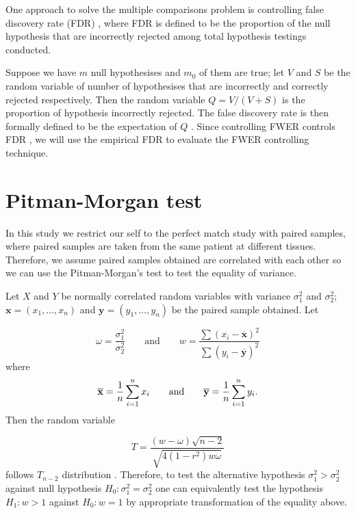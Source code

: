 \documentclass{report}
\begin{document}
\par
 One approach to solve the multiple comparisons problem is controlling false discovery 
rate (FDR) \cite{benjamini1995controlling}, where FDR is defined to be the proportion of the null
hypothesis that are incorrectly rejected among total hypothesis testings conducted.
\par Suppose we have $m$ null hypothesises and $m_0$ of them are true; let $V$ and $S$ 
be the random variable of number of hypothesises that are incorrectly and correctly rejected respectively. 
Then the random variable $Q = V/(V+S)$ is the proportion of hypothesis incorrectly rejected. The false discovery rate is then formally defined to be the expectation of $Q$ \cite{benjamini1995controlling}.
Since controlling FWER controls FDR \cite{benjamini1995controlling}, we will use the empirical FDR to evaluate the FWER controlling technique. 





\section{Pitman-Morgan test} \label{section : pitman-morgan test}
\par
In this study we restrict our self to the perfect match study with paired samples, where paired samples are taken from the same patient at different tissues.
Therefore, we assume paired samples obtained are correlated with each other so we can use 
the Pitman-Morgan's test to test the equality of variance.
\par 
 Let $X$ and $Y$ be normally correlated random variables with variance $\sigma_1^2$ and $\sigma_2^2$; 
$\mathbf{x} = (x_1,\ldots,x_n)$ and $\mathbf{y} = (y_1,\ldots,y_n)$ be the paired sample obtained. Let

\[ 
    \omega = \frac{\sigma_1^2}{\sigma_2^2} \qquad \text{and}\qquad  w = \frac{ \sum (x_i - \overline{\mathbf{x}})^2}{ \sum (y_i - \overline{\mathbf{y}})^2}
\]
where
\[ 
    \overline{\mathbf{x}} = \frac{1}{n} \sum\limits_{i=1}^{n} x_i \qquad \text{and}\qquad  \overline{\mathbf{y}} = \frac{1}{n} \sum\limits_{i=1}^{n} y_i.
\] 
Then the random variable

\[
T = \frac{(w - \omega)\sqrt{n-2}}{\sqrt{4(1-r^2)w\omega}}
\]
follows $T_{n-2}$ distribution \cite{pitman1939note,morgan1939test}. Therefore, to test the alternative hypothesis
$\sigma_1^2 > \sigma_2^2$ against null hypothesis $H_0 : \sigma_1^2 = \sigma_2^2$ one can
equivalently test the hypothesis $H_1 : w > 1$ against $H_0 : w = 1$ by appropriate transformation of the 
equality above.
\end{document}
